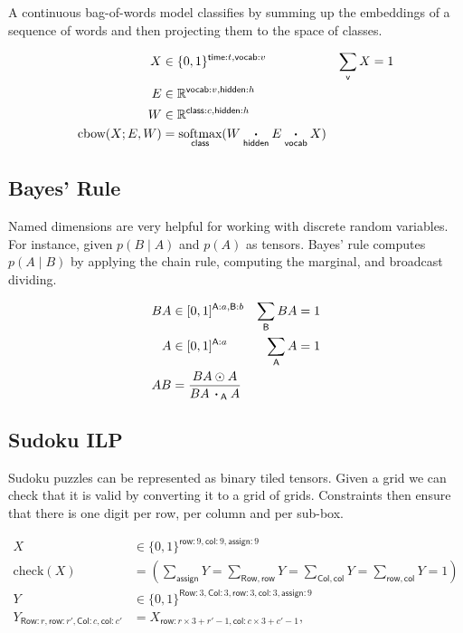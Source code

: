 \documentclass{article}
\newcommand{\name}[1]{\mathsf{#1}}
\newcommand{\ndot}[1]{\mathbin{\mathop{\thinspace\boldsymbol\cdot\thinspace}\displaylimits_{\name{#1}}}}
\newcommand{\nsum}[1]{\mathop{\sum}_{\name{#1}}}
\newcommand{\nfun}[2]{\mathop{\text{#2}}\displaylimits_{\name{#1}}}
\newcommand{\reals}{\mathbb{R}}
\begin{document}
A continuous bag-of-words model classifies by summing up the embeddings of a sequence of words and then projecting them to the space of classes. 

\begin{align*} 
X &\in \{0, 1\}^{{\name{time}:t, \name{vocab}:v}} & \nsum{v} X &= 1\\
E &\in \reals^{{\name{vocab}:v, \name{hidden}:h}}\\
W &\in \reals^{{\name{class}:c, \name{hidden}:h}}\\
\text{cbow}(X; E, W) &= \nfun{class}{softmax} (W \ndot{hidden} E \ndot{vocab} X)
\end{align*}

\subsection{Bayes' Rule}

Named dimensions are very helpful for working with discrete random
variables. For instance, given $p(B \mid A)$ and $p(A)$ as
tensors. Bayes' rule computes $p(A \mid B)$ by applying the chain
rule, computing the marginal, and broadcast dividing.

\begin{align*} 
BA &\in [0, 1]^{\name{A}:a, \name{B}:b} & \nsum{B} BA &= 1 \\
A &\in [0, 1]^{\name{A}:a} & \nsum{A} A &= 1 \\
AB &= \frac{BA \odot A}{BA \ndot{A} A}
\end{align*}

\subsection{Sudoku ILP}

Sudoku puzzles can be represented as  binary tiled tensors.
Given a grid we can check that it is valid by converting it to a grid of grids. 
Constraints then ensure that there is one digit per row, per column and per sub-box. 

\begin{align*} 
X &\in \{0, 1\}^{\name{row}: 9, \name{col}:9, \name{assign}:9}  \\
\text{check}(X) &=
\left(\nsum{assign} Y = 
\nsum{Row,row} Y = 
\nsum{Col, col} Y =  
\nsum{row, col} Y = 1 \right) \\
Y &\in \{0, 1\}^{\name{Row}: 3, \name{Col}:3, \name{row}: 3, \name{col}:3, \name{assign}:9}  \\
Y_{\name{Row}:r, \name{row}:r', \name{Col}:c, \name{col}:c'} &= X_{\name{row}:r\times 3 + r'-1, \name{col}:c\times3 + c'-1}, 
\end{align*} 
\end{document}
